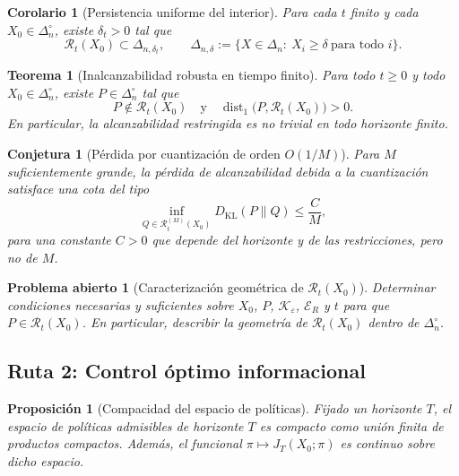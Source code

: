 \documentclass[12pt]{article}
\newtheorem{proposicion}{Proposición}[section]
\newtheorem{teorema}{Teorema}[section]
\newtheorem{corolario}{Corolario}[section]
\newtheorem{conjetura}{Conjetura}[section]
\newtheorem{problema}{Problema abierto}[section]
\begin{document}
\begin{corolario}[Persistencia uniforme del interior]\label{cor:interior-persistente}
Para cada $t$ finito y cada $X_0\in\Delta_n^\circ$, existe $\delta_t>0$ tal
que
\[
\mathcal R_t(X_0)\subset \Delta_{n,\delta_t},
\qquad
\Delta_{n,\delta}:=\{X\in\Delta_n:\ X_i\ge\delta\ \text{para todo }i\}.
\]
\end{corolario}

\begin{teorema}[Inalcanzabilidad robusta en tiempo finito]\label{teo:inalcanzabilidad-robusta}
Para todo $t\ge 0$ y todo $X_0\in\Delta_n^\circ$, existe $P\in\Delta_n^\circ$
tal que
\[
P\notin\mathcal R_t(X_0)
\quad\text{y}\quad
\operatorname{dist}_1\!\bigl(P,\mathcal R_t(X_0)\bigr)>0.
\]
En particular, la alcanzabilidad restringida es no trivial en todo horizonte
finito.
\end{teorema}

\begin{conjetura}[Pérdida por cuantización de orden $O(1/M)$]\label{conj:cuantizacion}
Para $M$ suficientemente grande, la pérdida de alcanzabilidad debida a la
cuantización satisface una cota del tipo
\[
\inf_{Q\in\mathcal R_t^{(M)}(X_0)}D_{\mathrm{KL}}(P\|Q)\le \frac{C}{M},
\]
para una constante $C>0$ que depende del horizonte y de las restricciones, pero
no de $M$.
\end{conjetura}

\begin{problema}[Caracterización geométrica de $\mathcal R_t(X_0)$]\label{prob:caracterizacion-reach}
Determinar condiciones necesarias y suficientes sobre $X_0$, $P$,
$\mathcal K_\varepsilon$, $\mathcal E_R$ y $t$ para que $P\in\mathcal R_t(X_0)$.
En particular, describir la geometría de $\mathcal R_t(X_0)$ dentro de
$\Delta_n^\circ$.
\end{problema}

\subsection*{Ruta 2: Control óptimo informacional}

\begin{proposicion}[Compacidad del espacio de políticas]\label{prop:politicas-compactas}
Fijado un horizonte $T$, el espacio de políticas admisibles de horizonte $T$
es compacto como unión finita de productos compactos. Además, el funcional
$\pi\mapsto J_T(X_0;\pi)$ es continuo sobre dicho espacio.
\end{proposicion}
\end{document}
